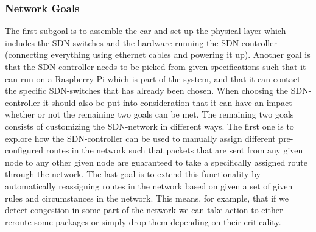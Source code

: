 \documentclass[11pt, titlepage]{article} %
\begin{document}
\subsubsection{Network Goals}
The first subgoal is to assemble the car and set up the physical layer
which includes the SDN-switches and the hardware running the SDN-controller
(connecting everything using ethernet cables and powering it up).
Another goal is that the SDN-controller needs to be picked from given
specifications such that it can run on a Raspberry Pi which is part of
the system, and that it can contact the specific SDN-switches that has
already been chosen. When choosing the SDN-controller it should also be 
put into consideration that it can have an impact whether or not the
remaining two goals can be met. The remaining two goals consists of
customizing the SDN-network in different ways. The first one is to
explore how the SDN-controller can be used to manually assign different
pre-configured routes in the network such that packets that are sent from
any given node to any other given node are guaranteed to take a
specifically assigned route through the network. The last goal is to
extend this functionality by automatically reassigning routes in the
network based on given a set of given rules and circumstances in the
network. This means, for example, that if we detect congestion in some
part of the network we can take action to either reroute some packages
or simply drop them depending on their criticality.
\end{document}
